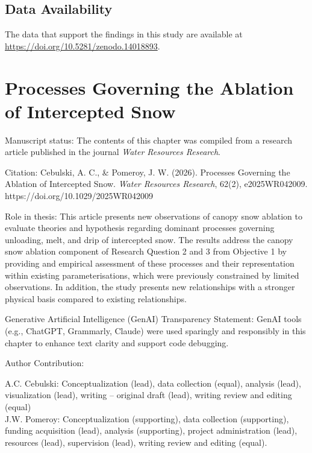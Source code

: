 \documentclass[
  letterpaper,
]{tex/uofsthesis-cs}
\begin{document}
\section{Data Availability}\label{data-availability}

The data that support the findings in this study are available at
\url{https://doi.org/10.5281/zenodo.14018893}.


\chapter{Processes Governing the Ablation of Intercepted
Snow}\label{sec-chapter-4}

Manuscript status: The contents of this chapter was compiled from a
research article published in the journal \emph{Water Resources
Research}.

Citation: Cebulski, A. C., \& Pomeroy, J. W. (2026). Processes Governing
the Ablation of Intercepted Snow. \emph{Water Resources Research},
62(2), e2025WR042009. https://doi.org/10.1029/2025WR042009

Role in thesis: This article presents new observations of canopy snow
ablation to evaluate theories and hypothesis regarding dominant
processes governing unloading, melt, and drip of intercepted snow. The
results address the canopy snow ablation component of Research Question
2 and 3 from Objective 1 by providing and empirical assessment of these
processes and their representation within existing parameterisations,
which were previously constrained by limited observations. In addition,
the study presents new relationships with a stronger physical basis
compared to existing relationships.

Generative Artificial Intelligence (GenAI) Transparency Statement: GenAI
tools (e.g., ChatGPT, Grammarly, Claude) were used sparingly and
responsibly in this chapter to enhance text clarity and support code
debugging.

Author Contribution:

A.C. Cebulski: Conceptualization (lead), data collection (equal),
analysis (lead), visualization (lead), writing -- original draft (lead),
writing review and editing (equal)\\
J.W. Pomeroy: Conceptualization (supporting), data collection
(supporting), funding acquisition (lead), analysis (supporting), project
administration (lead), resources (lead), supervision (lead), writing
review and editing (equal).
\end{document}
